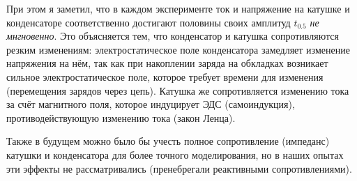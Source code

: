 При этом я заметил, что в каждом эксперименте ток и напряжение на катушке и конденсаторе соответственно достигают половины своих амплитуд \(t_{0.5}\) \textit{не мнгновенно}. Это объясняется тем, что конденсатор и катушка сопротивляются резким изменениям: электростатическое поле конденсатора замедляет изменение напряжения на нём, так как при накоплении заряда на обкладках возникает сильное электростатическое поле, которое требует времени для изменения (перемещения зарядов через цепь). Катушка же сопротивляется изменению тока за счёт магнитного поля, которое индуцирует ЭДС (самоиндукция), противодействующую изменению тока (закон Ленца).

Также в будущем можно было бы учесть полное сопротивление (импеданс) катушки и конденсатора для более точного моделирования, но в наших опытах эти эффекты не рассматривались (пренебрегали реактивными сопротивлениями).
